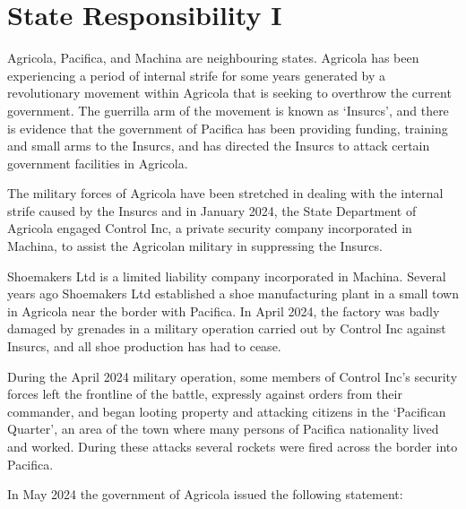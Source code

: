\section{State Responsibility I}
\begin{tutorialquestion}
    \flushleft

    Agricola, Pacifica, and Machina are neighbouring states. Agricola has been experiencing a period of internal strife for some years generated by a revolutionary movement within Agricola that is seeking to overthrow the current government. The guerrilla arm of the movement is known as `Insurcs', and there is evidence that the government of Pacifica has been providing funding, training and small arms to the Insurcs, and has directed the Insurcs to attack certain government facilities in Agricola.
    
    \vspace{\baselineskip}

    The military forces of Agricola have been stretched in dealing with the internal strife caused by the Insurcs and in January 2024, the State Department of Agricola engaged Control Inc, a private security company incorporated in Machina, to assist the Agricolan military in suppressing the Insurcs.

    \vspace{\baselineskip}
    
    Shoemakers Ltd is a limited liability company incorporated in Machina. Several years ago Shoemakers Ltd established a shoe manufacturing plant in a small town in Agricola near the border with Pacifica. In April 2024, the factory was badly damaged by grenades in a military operation carried out by Control Inc against Insurcs, and all shoe production has had to cease.
    
    \vspace{\baselineskip}
    
    During the April 2024 military operation, some members of Control Inc’s security forces left the frontline of the battle, expressly against orders from their commander, and began looting property and attacking citizens in the `Pacifican Quarter', an area of the town where many persons of Pacifica nationality lived and worked. During these attacks several rockets were fired across the border into Pacifica.

    \vspace{\baselineskip}

    In May 2024 the government of Agricola issued the following statement:
    

\end{tutorialquestion}
